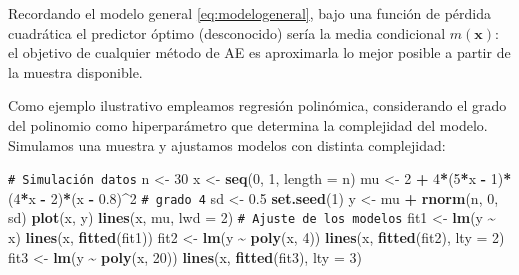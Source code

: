 \documentclass[
]{book}
\newenvironment{Shaded}{\begin{snugshade}}{\end{snugshade}}
\newcommand{\AttributeTok}[1]{\textcolor[rgb]{0.13,0.29,0.53}{#1}}
\newcommand{\CommentTok}[1]{\textcolor[rgb]{0.56,0.35,0.01}{\textit{#1}}}
\newcommand{\DecValTok}[1]{\textcolor[rgb]{0.00,0.00,0.81}{#1}}
\newcommand{\FloatTok}[1]{\textcolor[rgb]{0.00,0.00,0.81}{#1}}
\newcommand{\FunctionTok}[1]{\textcolor[rgb]{0.13,0.29,0.53}{\textbf{#1}}}
\newcommand{\NormalTok}[1]{#1}
\newcommand{\OtherTok}[1]{\textcolor[rgb]{0.56,0.35,0.01}{#1}}
\newcommand{\SpecialCharTok}[1]{\textcolor[rgb]{0.81,0.36,0.00}{\textbf{#1}}}
\renewcommand{\mathbf}[1]{\symbf{#1}}
\theoremstyle{break}
\theoremstyle{nonumberplain}
\renewcommand{\CommentTok}[1]{\textcolor[rgb]{0.41,0.41,0.41}{\texttt{#1}}}
\begin{document}
Recordando el modelo general \eqref{eq:modelogeneral}, bajo una función de pérdida cuadrática el predictor óptimo (desconocido) sería la media condicional \(m(\mathbf{x})\): el objetivo de cualquier método de AE es aproximarla lo mejor posible a partir de la muestra disponible.

Como ejemplo ilustrativo empleamos regresión polinómica, considerando el grado del polinomio como hiperparámetro que determina la complejidad del modelo. Simulamos una muestra y ajustamos modelos con distinta complejidad:

\begin{Shaded}
\begin{Highlighting}[]
\CommentTok{\# Simulación datos}
\NormalTok{n }\OtherTok{\textless{}{-}} \DecValTok{30}
\NormalTok{x }\OtherTok{\textless{}{-}} \FunctionTok{seq}\NormalTok{(}\DecValTok{0}\NormalTok{, }\DecValTok{1}\NormalTok{, }\AttributeTok{length =}\NormalTok{ n)}
\NormalTok{mu }\OtherTok{\textless{}{-}} \DecValTok{2} \SpecialCharTok{+} \DecValTok{4}\SpecialCharTok{*}\NormalTok{(}\DecValTok{5}\SpecialCharTok{*}\NormalTok{x }\SpecialCharTok{{-}} \DecValTok{1}\NormalTok{)}\SpecialCharTok{*}\NormalTok{(}\DecValTok{4}\SpecialCharTok{*}\NormalTok{x }\SpecialCharTok{{-}} \DecValTok{2}\NormalTok{)}\SpecialCharTok{*}\NormalTok{(x }\SpecialCharTok{{-}} \FloatTok{0.8}\NormalTok{)}\SpecialCharTok{\^{}}\DecValTok{2} \CommentTok{\# grado 4}
\NormalTok{sd }\OtherTok{\textless{}{-}} \FloatTok{0.5}
\FunctionTok{set.seed}\NormalTok{(}\DecValTok{1}\NormalTok{)}
\NormalTok{y }\OtherTok{\textless{}{-}}\NormalTok{ mu }\SpecialCharTok{+} \FunctionTok{rnorm}\NormalTok{(n, }\DecValTok{0}\NormalTok{, sd)}
\FunctionTok{plot}\NormalTok{(x, y)}
\FunctionTok{lines}\NormalTok{(x, mu, }\AttributeTok{lwd =} \DecValTok{2}\NormalTok{)}
\CommentTok{\# Ajuste de los modelos}
\NormalTok{fit1 }\OtherTok{\textless{}{-}} \FunctionTok{lm}\NormalTok{(y }\SpecialCharTok{\textasciitilde{}}\NormalTok{ x)}
\FunctionTok{lines}\NormalTok{(x, }\FunctionTok{fitted}\NormalTok{(fit1))}
\NormalTok{fit2 }\OtherTok{\textless{}{-}} \FunctionTok{lm}\NormalTok{(y }\SpecialCharTok{\textasciitilde{}} \FunctionTok{poly}\NormalTok{(x, }\DecValTok{4}\NormalTok{))}
\FunctionTok{lines}\NormalTok{(x, }\FunctionTok{fitted}\NormalTok{(fit2), }\AttributeTok{lty =} \DecValTok{2}\NormalTok{)}
\NormalTok{fit3 }\OtherTok{\textless{}{-}} \FunctionTok{lm}\NormalTok{(y }\SpecialCharTok{\textasciitilde{}} \FunctionTok{poly}\NormalTok{(x, }\DecValTok{20}\NormalTok{))}
\FunctionTok{lines}\NormalTok{(x, }\FunctionTok{fitted}\NormalTok{(fit3), }\AttributeTok{lty =} \DecValTok{3}\NormalTok{)}

\end{Highlighting}
\end{Shaded}
\end{document}

